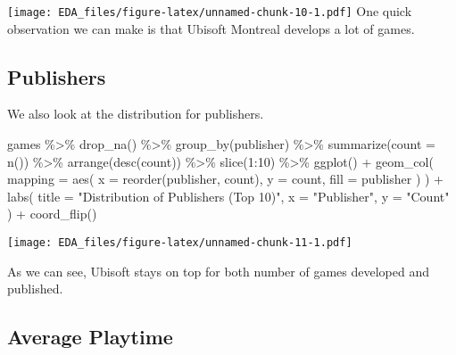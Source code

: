 \documentclass[
]{article}
\newenvironment{Shaded}{\begin{snugshade}}{\end{snugshade}}
\newcommand{\AttributeTok}[1]{\textcolor[rgb]{0.77,0.63,0.00}{#1}}
\newcommand{\DecValTok}[1]{\textcolor[rgb]{0.00,0.00,0.81}{#1}}
\newcommand{\FunctionTok}[1]{\textcolor[rgb]{0.00,0.00,0.00}{#1}}
\newcommand{\NormalTok}[1]{#1}
\newcommand{\SpecialCharTok}[1]{\textcolor[rgb]{0.00,0.00,0.00}{#1}}
\newcommand{\StringTok}[1]{\textcolor[rgb]{0.31,0.60,0.02}{#1}}
\begin{document}
\texttt{[image: EDA\_files/figure-latex/unnamed-chunk-10-1.pdf]} One
quick observation we can make is that Ubisoft Montreal develops a lot of
games.

\hypertarget{publishers}{%
\subsection{Publishers}\label{publishers}}

We also look at the distribution for publishers.

\begin{Shaded}
\begin{Highlighting}[]
\NormalTok{games }\SpecialCharTok{\%\textgreater{}\%}
  \FunctionTok{drop\_na}\NormalTok{() }\SpecialCharTok{\%\textgreater{}\%}
  \FunctionTok{group\_by}\NormalTok{(publisher) }\SpecialCharTok{\%\textgreater{}\%}
  \FunctionTok{summarize}\NormalTok{(}\AttributeTok{count =} \FunctionTok{n}\NormalTok{()) }\SpecialCharTok{\%\textgreater{}\%}
  \FunctionTok{arrange}\NormalTok{(}\FunctionTok{desc}\NormalTok{(count)) }\SpecialCharTok{\%\textgreater{}\%}
  \FunctionTok{slice}\NormalTok{(}\DecValTok{1}\SpecialCharTok{:}\DecValTok{10}\NormalTok{) }\SpecialCharTok{\%\textgreater{}\%}
  \FunctionTok{ggplot}\NormalTok{() }\SpecialCharTok{+}
  \FunctionTok{geom\_col}\NormalTok{(}
    \AttributeTok{mapping =} \FunctionTok{aes}\NormalTok{(}
      \AttributeTok{x =} \FunctionTok{reorder}\NormalTok{(publisher, count),}
      \AttributeTok{y =}\NormalTok{ count,}
      \AttributeTok{fill =}\NormalTok{ publisher}
\NormalTok{    )}
\NormalTok{  ) }\SpecialCharTok{+}
  \FunctionTok{labs}\NormalTok{(}
    \AttributeTok{title =} \StringTok{"Distribution of Publisher\textquotesingle{}s (Top 10)"}\NormalTok{,}
    \AttributeTok{x =} \StringTok{"Publisher"}\NormalTok{,}
    \AttributeTok{y =} \StringTok{"Count"}
\NormalTok{  ) }\SpecialCharTok{+}
  \FunctionTok{coord\_flip}\NormalTok{()}
\end{Highlighting}
\end{Shaded}

\texttt{[image: EDA\_files/figure-latex/unnamed-chunk-11-1.pdf]}

As we can see, Ubisoft stays on top for both number of games developed
and published.

\hypertarget{average-playtime}{%
\subsection{Average Playtime}\label{average-playtime}}
\end{document}
